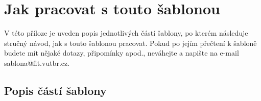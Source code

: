 





\chapter{Jak pracovat s touto šablonou}
\label{jak}

V této příloze je uveden popis jednotlivých částí šablony, po kterém následuje stručný návod, jak s touto šablonou pracovat. Pokud po jejím přečtení k šabloně budete mít nějaké dotazy, připomínky apod., neváhejte a napište na e-mail sablona@fit.vutbr.cz.

\section*{Popis částí šablony}

